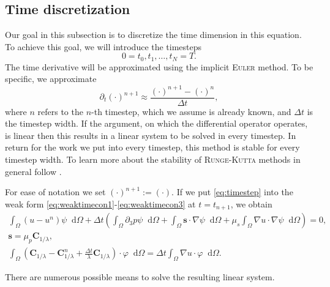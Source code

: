 \documentclass[12pt,a4paper,twoside, open=right]{scrreprt}
\theoremstyle{definition}
\theoremstyle{plain}
\newcommand{\bfs}{\bm{s}}
\newcommand{\bfC}{\bm{C}}
\newcommand{\D}{\mathop{}\!\mathrm{d}}
\begin{document}
\subsection{Time discretization}
Our goal in this subsection is to discretize the time dimension in this equation. To achieve this goal, we will introduce the timesteps
\begin{equation}
    0=t_0,t_1,\dotsc,t_N=T.
\end{equation}
The time derivative will be approximated using the implicit \textsc{Euler} method. To be specific, we approximate 
\begin{equation}
    \partial_t(\cdot)^{n+1}\approx\frac{(\cdot)^{n+1}-(\cdot)^n}{\Delta t},\label{eq:timestep}
\end{equation}
where $n$ refers to the $n$-th timestep, which we assume is already known, and $\Delta t$ is the timestep width. If the argument, on which the differential operator operates, is linear then this results in a linear system to be solved in every timestep. In return for the work we put into every timestep, this method is stable for every timestep width. To learn more about the stability of \textsc{Runge-Kutta} methods in general follow \cite{Hairer1986}.
\par 
For ease of notation we set $(\cdot)^{n+1}:=(\cdot)$. If we put \eqref{eq:timestep} into the weak form \eqref{eq:weaktimecon1}-\eqref{eq:weaktimecon3} at $t=t_{n+1}$, we obtain 
\begin{align}
\label{eq:timedisc1}
  \int_\Omega(u-u^n)\psi\D\Omega +\Delta t\left(\int_\Omega\partial_3 p\psi\D\Omega + \int_\Omega\bfs\cdot\nabla\psi\D\Omega+\mu_s\int_\Omega\nabla u\cdot\nabla\psi\D\Omega\right) = 0,\\
  \label{eq:timedisc2}
  \bfs =\mu_p\bfC_{1/\lambda},\\
  \label{eq:timedisc3}
  \int_\Omega(\bfC_{1/\lambda} - \bfC_{1/\lambda}^n +\frac{\Delta t}{\lambda}\bfC_{1/\lambda})\cdot\varphi\D\Omega = 
  \Delta t\int_\Omega\nabla u\cdot\varphi\D\Omega.
\end{align}
\par 
There are numerous possible means to solve the resulting linear system. 
\end{document}

